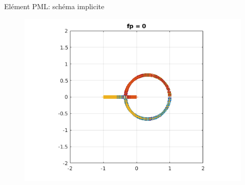\begin{frame}{Elément PML: schéma implicite}
\begin{figure}[ht] 
  \label{ fig7} 
  \begin{minipage}[b]{0.5\linewidth}
    \centering
    \includegraphics[scale=.34]{images/eig_imp_pml0.png} \\


\end{minipage}
\end{figure}
\end{frame}
